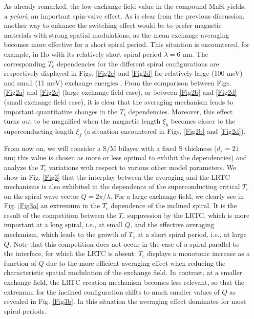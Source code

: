 \documentclass[prb,amsmath,amssymb,reprint]{revtex4-2}
\begin{document}
As already remarked, the low exchange field value in the compound MnSi  yields, {\it a priori}, an important spin-valve effect.
As is clear from the previous discussion, another way to enhance the switching effect would be to prefer magnetic materials with strong spatial modulations, as the mean exchange averaging becomes more effective for a short spiral period. This situation is encountered,  for example, in Ho with its relatively short spiral period $\lambda=6$ nm. The corresponding $T_c$ dependencies for the different spiral configurations are respectively displayed in Figs. \ref{Fig2c} and \ref{Fig2d}  for relatively large (100 meV) and small (11 meV) exchange energies \cite{remark}.
From the comparison between Figs. \ref{Fig2a} and \ref{Fig2c} (large exchange field case), or between \ref{Fig2b} and \ref{Fig2d} (small exchange field case), it is clear that the averaging mechanism leads to important quantitative changes in the $T_c$ dependencies. Moreover, this effect turns out to be magnified when the magnetic length $\xi_h$ becomes closer to the superconducting length $\xi_f$ (a situation encountered in Figs. \ref{Fig2b} and \ref{Fig2d}).


From now on, we will consider a S/M bilayer with a fixed S thickness ($d_s=21$ nm; this value is chosen as more or less optimal to exhibit the dependencies) and analyze the $T_c$ variations with respect to various other model parameters. We show in Fig. \ref{Fig3} that
the interplay between the averaging and the LRTC mechanisms is also exhibited in the dependence of the superconducting critical $T_c$ on the spiral wave vector $Q=2 \pi/\lambda$. For a large exchange field, we clearly see in Fig. \ref{Fig3a} an extremum in the $T_c$ dependence of the inclined spiral. It is the result of the competition between the  $T_c$ suppression by the LRTC, which is more
important at a long spiral, i.e., at small $Q$, and the effective averaging mechanism, which leads to the growth of $T_c$ at a short spiral period, i.e., at large $Q$. Note that this competition does not occur in the case of a spiral parallel to the interface, for which the LRTC is absent: $T_c$ displays a monotonic increase as a function of $Q$ due to the more efficient averaging effect when reducing the characteristic spatial modulation of the exchange field.
In contrast, at a smaller exchange field, the LRTC creation mechanism becomes less relevant, so that the extremum for the inclined configuration shifts to much smaller values of $Q$ as revealed in Fig. \ref{Fig3b}. In this situation the averaging effect dominates
for most spiral periods.
\end{document}
